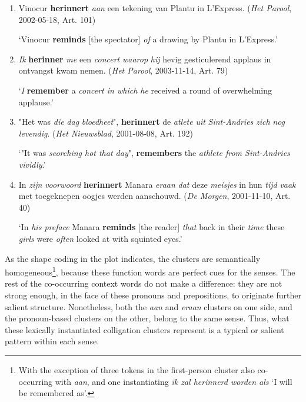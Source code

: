\documentclass[
]{book}
\begin{document}
\begin{enumerate}
\def\labelenumi{(\arabic{enumi})}
\setcounter{enumi}{27}
\item
  Vinocur \textbf{herinnert} \emph{aan} een tekening van Plantu in L'Express. (\emph{Het Parool}, 2002-05-18, Art. 101)

  `Vinocur \textbf{reminds} {[}the spectator{]} \emph{of} a drawing by Plantu in L'Express.'
\item
  \emph{Ik} \textbf{herinner} \emph{me} een \emph{concert} \emph{waarop} \emph{hij} hevig gesticulerend applaus in ontvangst kwam nemen. (\emph{Het Parool}, 2003-11-14, Art. 79)

  `\emph{I} \textbf{remember} a \emph{concert in which he} received a round of overwhelming applause.'
\item
  "Het was \emph{die} \emph{dag} \emph{bloedheet}", \textbf{herinnert} de \emph{atlete} \emph{uit} \emph{Sint-Andries} \emph{zich} \emph{nog} \emph{levendig}. (\emph{Het Nieuwsblad}, 2001-08-08, Art. 192)

  `"It was \emph{scorching hot that day}", \textbf{remembers} the \emph{athlete from Sint-Andries vividly}.'
\item
  In \emph{zijn} \emph{voorwoord} \textbf{herinnert} Manara \emph{eraan} \emph{dat} deze \emph{meisjes} in hun \emph{tijd} \emph{vaak} met toegeknepen oogjes werden aanschouwd. (\emph{De Morgen}, 2001-11-10, Art. 40)

  `In \emph{his preface} Manara \textbf{reminds} {[}the reader{]} \emph{that} back in their \emph{time} these \emph{girls} were \emph{often} looked at with squinted eyes.'
\end{enumerate}

As the shape coding in the plot indicates, the clusters are semantically homogeneous\footnote{With the exception of three tokens in the first-person cluster also co-occurring with \emph{aan}, and one instantiating \emph{ik zal herinnerd worden als} `I will be remembered as'.}, because these function words are perfect cues for the senses. The rest of the co-occurring context words do not make a difference: they are not strong enough, in the face of these pronouns and prepositions, to originate further salient structure. Nonetheless, both the \emph{aan} and \emph{eraan} clusters on one side, and the pronoun-based clusters on the other, belong to the same sense. Thus, what these lexically instantiated colligation clusters represent is a typical or salient pattern within each sense.
\end{document}

